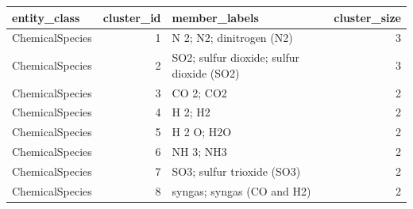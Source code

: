 \begin{tabular}{lrlr}
\toprule
entity\_class & cluster\_id & member\_labels & cluster\_size \\
\midrule
ChemicalSpecies & 1 & N 2; N2; dinitrogen (N2) & 3 \\
ChemicalSpecies & 2 & SO2; sulfur dioxide; sulfur dioxide (SO2) & 3 \\
ChemicalSpecies & 3 & CO 2; CO2 & 2 \\
ChemicalSpecies & 4 & H 2; H2 & 2 \\
ChemicalSpecies & 5 & H 2 O; H2O & 2 \\
ChemicalSpecies & 6 & NH 3; NH3 & 2 \\
ChemicalSpecies & 7 & SO3; sulfur trioxide (SO3) & 2 \\
ChemicalSpecies & 8 & syngas; syngas (CO and H2) & 2 \\
\bottomrule
\end{tabular}
